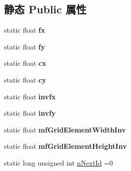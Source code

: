 \subsection*{静态 Public 属性}
\begin{DoxyCompactItemize}
\item 
\hypertarget{classORB__SLAM2_1_1Frame_ab505e3f86afa1c3d16b98fda89ec394c}{static float {\bfseries fx}}\label{classORB__SLAM2_1_1Frame_ab505e3f86afa1c3d16b98fda89ec394c}

\item 
\hypertarget{classORB__SLAM2_1_1Frame_a226a0adc90bc7a09502fc4db00ee20d7}{static float {\bfseries fy}}\label{classORB__SLAM2_1_1Frame_a226a0adc90bc7a09502fc4db00ee20d7}

\item 
\hypertarget{classORB__SLAM2_1_1Frame_a5f2803f215bc30016bd0833d8c7d5942}{static float {\bfseries cx}}\label{classORB__SLAM2_1_1Frame_a5f2803f215bc30016bd0833d8c7d5942}

\item 
\hypertarget{classORB__SLAM2_1_1Frame_abf6a631b787270da2d5b3c0f53615b62}{static float {\bfseries cy}}\label{classORB__SLAM2_1_1Frame_abf6a631b787270da2d5b3c0f53615b62}

\item 
\hypertarget{classORB__SLAM2_1_1Frame_a617c29a929afd74d599c9e41fc71abea}{static float {\bfseries invfx}}\label{classORB__SLAM2_1_1Frame_a617c29a929afd74d599c9e41fc71abea}

\item 
\hypertarget{classORB__SLAM2_1_1Frame_ad1dfdeb6378b11477c1b94233f881345}{static float {\bfseries invfy}}\label{classORB__SLAM2_1_1Frame_ad1dfdeb6378b11477c1b94233f881345}

\item 
\hypertarget{classORB__SLAM2_1_1Frame_afc2f7799428918dbbf46f7dfc4ccd59d}{static float {\bfseries mf\-Grid\-Element\-Width\-Inv}}\label{classORB__SLAM2_1_1Frame_afc2f7799428918dbbf46f7dfc4ccd59d}

\item 
\hypertarget{classORB__SLAM2_1_1Frame_a010327bee872485894b5905d17462086}{static float {\bfseries mf\-Grid\-Element\-Height\-Inv}}\label{classORB__SLAM2_1_1Frame_a010327bee872485894b5905d17462086}

\item 
\hypertarget{classORB__SLAM2_1_1Frame_a1ea8a00151931d155747283850467733}{static long unsigned int \hyperlink{classORB__SLAM2_1_1Frame_a1ea8a00151931d155747283850467733}{n\-Next\-Id} =0}\label{classORB__SLAM2_1_1Frame_a1ea8a00151931d155747283850467733}


\end{DoxyCompactItemize}
